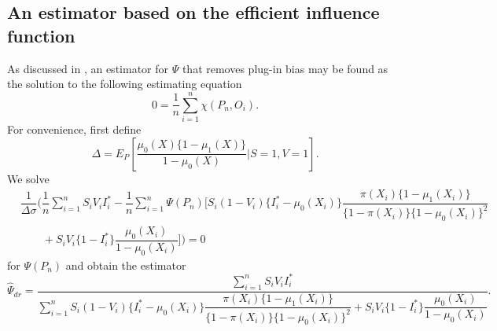 \begin{appendix}


\subsection{An estimator based on the efficient influence function}
As discussed in \textcite{hines_demystifying_2022}, an estimator for $\Psi$ that removes plug-in bias may be found as the solution to the following estimating equation 
\begin{equation*}
    0 = \dfrac{1}{n} \sum_{i=1}^n \chi(P_n, O_i).
\end{equation*}
For convenience, first define 
\begin{equation*}
    \Delta = E_P\left[\dfrac{\mu_0(X)\{1 - \mu_1(X)\}}{1 - \mu_0(X)} \bigg| S=1, V=1\right].
\end{equation*}
We solve 
\begin{align*}
    &\dfrac{1}{\Delta \sigma} \bigg(\dfrac{1}{n} \sum_{i=1}^n  S_i V_i I_i^* - \dfrac{1}{n} \sum_{i=1}^n \Psi(P_n) \bigg[  S_i (1 - V_i)\{I_i^* - \mu_0(X_i)\}\dfrac{\pi(X_i)\{1 - \mu_1(X_i)\}}{\{1 - \pi(X_i)\}\{1 - \mu_0(X_i)\}^2} \\
    &\qquad +  S_i V_i\{1-I_i^*\}\dfrac{\mu_0(X_i)}{1 - \mu_0(X_i)}\bigg]\bigg) = 0
\end{align*}
for $\Psi(P_n)$ and obtain the estimator
\begin{equation*}
    \widehat{\Psi}_{dr} = \dfrac{\sum_{i=1}^n   S_i V_i I_i^*}{\sum_{i=1}^n S_i (1 - V_i)\{I_i^* - \mu_0(X_i)\}\dfrac{\pi(X_i)\{1 - \mu_1(X_i)\}}{\{1 - \pi(X_i)\}\{1 - \mu_0(X_i)\}^2} +  S_i V_i\{1-I_i^*\}\dfrac{\mu_0(X_i)}{1 - \mu_0(X_i)}}.
\end{equation*}


\end{appendix}

